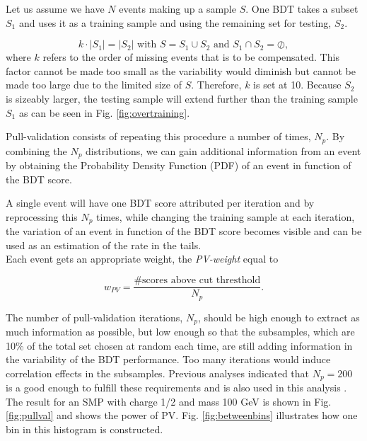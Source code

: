 \noindent Let us assume we have $N$ events making up a sample $S$. One BDT takes a subset $S_1$ and uses it as a training sample and using the remaining set for testing, $S_2$. 

\begin{equation}
k \cdot \left| S_1 \right| = \left| S_2 \right| \textrm{ with } S = S_1 \cup S_2 \textrm{ and } S_1 \cap S_2 = \oslash, 
\end{equation}
where $k$ refers to the order of missing events that is to be compensated. This factor cannot be made too small as the variability would diminish but cannot be made too large due to the limited size of $S$. Therefore, $k$ is set at 10. Because $S_2$ is sizeably larger, the testing sample will extend further than the training sample $S_1$ as can be seen in Fig. \ref{fig:overtraining}. 

Pull-validation consists of repeating this procedure a number of times, $N_p$. By combining the $N_p$ distributions, we can gain additional information from an event by obtaining the Probability Density Function (PDF) of an event in function of the BDT score. 

A single event will have one BDT score attributed per iteration and by reprocessing this $N_p$ times, while changing the training sample at each iteration, the variation of an event in function of the BDT score becomes visible and can be used as an estimation of the rate in the tails.\\

\noindent Each event gets an appropriate weight, the \textit{PV-weight} equal to

\begin{equation}
\label{eq:pullweight}
w_{PV} = \frac{\# \textrm{scores above cut thresthold}}{N_p}.
\end{equation}

The number of pull-validation iterations, $N_p$, should be high enough to extract as much information as possible, but low enough so that the subsamples, which are 10\% of the total set chosen at random each time, are still adding information in the variability of the BDT performance. Too many iterations would induce correlation effects in the subsamples. Previous analyses indicated that $N_p = 200$ is a good enough to fulfill these requirements and is also used in this analysis \cite{Aartsen:2016fep,Aartsen:2015exf}. The result for an SMP with charge 1/2 and mass 100 GeV is shown in Fig. \ref{fig:pullval} and shows the power of PV. Fig. \ref{fig:betweenbins} illustrates how one bin in this histogram is constructed.\\
 
